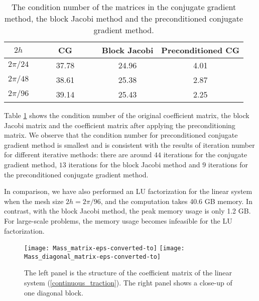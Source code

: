 \begin{table}[htbp]
	\begin{center}
		\begin{tabular}{|c|c c c|}
			\hline
			$2h$   & ~~~~ CG ~~~~& Block Jacobi & Preconditioned CG  \\
			\hline
			$2\pi/24$ &37.78& 24.96& 4.01\\
			\hline
			$2\pi/48$ &38.61 & 25.38 & 2.87\\
			\hline 
			$2\pi/96$ &39.14 &25.43 & 2.25\\
			\hline
		\end{tabular}
	\end{center}
		\caption{The condition number of the matrices in the conjugate gradient method, the block Jacobi method and the preconditioned conjugate gradient method.}\label{condition_number}
\end{table} 
Table \ref{condition_number} shows the condition number of the original coefficient matrix, the block Jacobi matrix and the coefficient matrix after applying the preconditioning matrix. We observe that the condition number for preconditioned conjugate gradient method is smallest and is consistent with the results of iteration number for different iterative methods: there are around $44$ iterations for the conjugate gradient method, $13$ iterations for the block Jacobi method and $9$ iterations for the preconditioned conjugate gradient method.

In comparison, we have also performed an LU factorization for the linear system when the mesh size $2h = 2\pi/96$, and the computation takes 40.6 GB memory. In contrast, with the block Jacobi method, the peak memory usage is only 1.2 GB. For large-scale problems, the memory usage becomes infeasible for the LU factorization. 

\begin{figure}[H]
	\centering
	\texttt{[image: Mass\_matrix-eps-converted-to]}
	\texttt{[image: Mass\_diagonal\_matrix-eps-converted-to]}
	\caption{The left panel is the structure of the coefficient matrix of the linear system (\ref{continuous_traction}).  The right panel shows a close-up of one diagonal block.}\label{Mass_matrix}
\end{figure}
